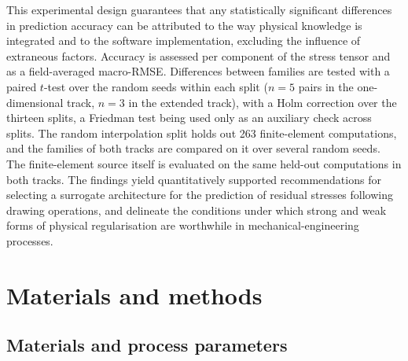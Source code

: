 \documentclass[subscriptcorrection,upint,varvw,barcolor=Goldenrod3,mathalfa=cal=euler,balance,hyphenate,french,pdf-a]{asmejour} %
\begin{document}
This experimental design guarantees that any statistically significant differences in prediction accuracy can be attributed to the way physical knowledge is integrated and to the software implementation, excluding the influence of extraneous factors. Accuracy is assessed per component of the stress tensor and as a field-averaged macro-RMSE. Differences between families are tested with a paired $t$-test over the random seeds within each split ($n = 5$ pairs in the one-dimensional track, $n = 3$ in the extended track), with a Holm correction over the thirteen splits, a Friedman test being used only as an auxiliary check across splits. The random interpolation split holds out 263 finite-element computations, and the families of both tracks are compared on it over several random seeds. The finite-element source itself is evaluated on the same held-out computations in both tracks.
The findings yield quantitatively supported recommendations for selecting a surrogate architecture for the prediction of residual stresses following drawing operations, and delineate the conditions under which strong and weak forms of physical regularisation are worthwhile in mechanical-engineering processes.



\section{Materials and methods}
\subsection{Materials and process parameters}
\label{sec:materials}
\end{document}
